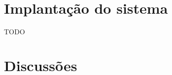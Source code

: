 



 
 
    
     

\section{Implantação do sistema}\label{sec:implantacaoSistema}

TODO

\section{Discussões}\label{sec:discussoes} 

